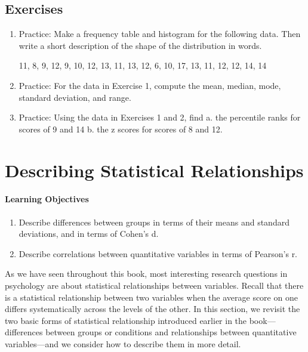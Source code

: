 \subsection{Exercises}
\begin{fullwidth}
\begin{enumerate}
\item Practice: Make a frequency table and histogram for the following data. Then write a short description of the shape of the distribution in words.

11, 8, 9, 12, 9, 10, 12, 13, 11, 13, 12, 6, 10, 17, 13, 11, 12, 12, 14, 14

\item Practice: For the data in Exercise 1, compute the mean, median, mode, standard deviation, and range.

\item Practice: Using the data in Exercises 1 and 2, find
a. the percentile ranks for scores of 9 and 14 b. the z scores for scores of 8 and 12.

\end{enumerate}
\end{fullwidth}


\section{Describing Statistical Relationships}

\paragraph{Learning Objectives}
    \begin{enumerate}
    \item   Describe differences between groups in terms of their means and standard deviations, and in terms of Cohen's d.

    \item Describe correlations between quantitative variables in terms of Pearson's r.

      \end{enumerate}


As we have seen throughout this book, most interesting research questions in psychology are about statistical relationships between variables. Recall that there is a statistical relationship between two variables when the average score on one differs systematically across the levels of the other. In this section, we revisit the two basic forms of statistical relationship introduced earlier in the book---differences between groups or conditions and relationships between quantitative variables---and we consider how to describe them in more detail.


